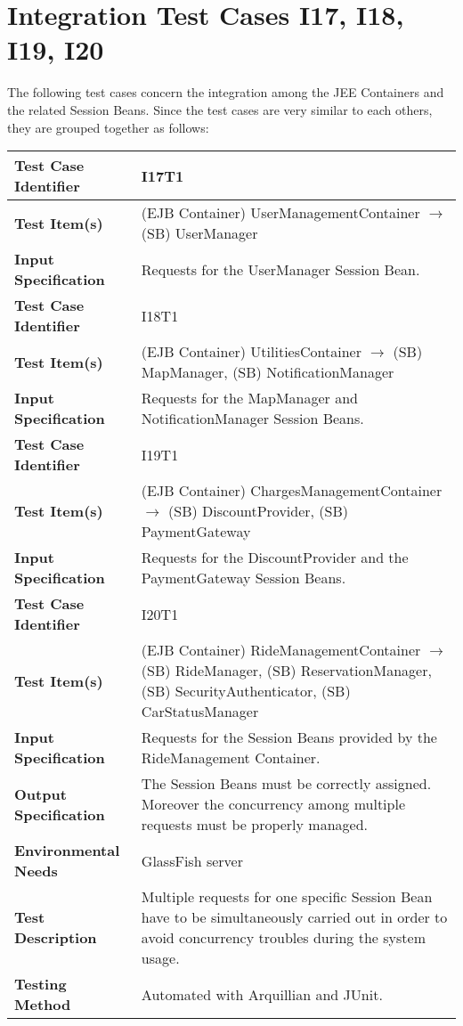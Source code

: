 \section{Integration Test Cases I17, I18, I19, I20}

The following test cases concern the integration among the JEE Containers and the related Session Beans. Since the test cases are very similar to each others, they are grouped together as follows:

\begin{longtable}{p{} | p{}}
\hline
\textbf{Test Case Identifier} & I17T1\\
\hline
\textbf{Test Item(s)} & (EJB Container) UserManagementContainer $\rightarrow$ (SB) UserManager \\
\hline
\textbf{Input Specification} & Requests for the UserManager Session Bean. \\
\hline
\hline
\textbf{Test Case Identifier} & I18T1\\
\hline
\textbf{Test Item(s)} & (EJB Container) UtilitiesContainer $\rightarrow$ (SB) MapManager, (SB) NotificationManager \\
\hline
\textbf{Input Specification} & Requests for the MapManager and NotificationManager Session Beans. \\
\hline
\hline
\textbf{Test Case Identifier} & I19T1\\
\hline
\textbf{Test Item(s)} & (EJB Container) ChargesManagementContainer $\rightarrow$ (SB) DiscountProvider, (SB) PaymentGateway \\
\hline
\textbf{Input Specification} & Requests for the DiscountProvider and the PaymentGateway Session Beans. \\
\hline
\hline
\textbf{Test Case Identifier} & I20T1\\
\hline
\textbf{Test Item(s)} & (EJB Container) RideManagementContainer $\rightarrow$ (SB) RideManager, (SB) ReservationManager, (SB) SecurityAuthenticator, (SB) CarStatusManager \\
\hline
\textbf{Input Specification} & Requests for the Session Beans provided by the RideManagement Container. \\
\hline
\hline
\textbf{Output Specification} & The Session Beans must be correctly assigned. Moreover the concurrency among multiple requests must be properly managed. \\
\hline
\textbf{Environmental Needs} & GlassFish server \\
\hline
\textbf{Test Description} & Multiple requests for one specific Session Bean have to be simultaneously carried out in order to avoid concurrency troubles during the system usage. \\
\hline
\textbf{Testing Method} & Automated with Arquillian and JUnit. \\
\hline
\end{longtable}

